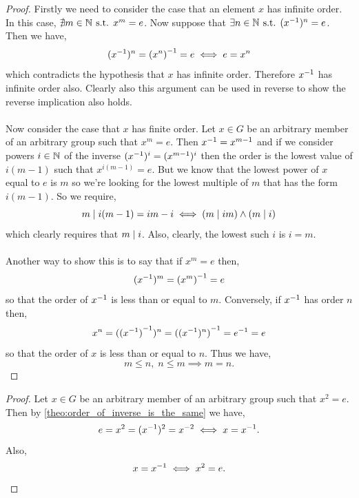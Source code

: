 \documentclass[MathsNotesBase.tex]{subfiles}
\begin{document}
{	
	\begin{proof}
		Firstly we need to consider the case that an element $x$ has infinite order. In this case, ${ \nexists m \in \mathbb{N}^{} \text{ s.t. } x^m = e }$. Now suppose that ${ \exists n \in \mathbb{N}^{} \text{ s.t. } ({x}^{-1})^n = e }$. Then we have,
		\[ ({x}^{-1})^n = {(x^n)}^{-1} = e \iff e = x^n \]
		which contradicts the hypothesis that $x$ has infinite order. Therefore ${ {x}^{-1} }$ has infinite order also. Clearly also this argument can be used in reverse to show the reverse implication also holds.\\\\
		Now consider the case that $x$ has finite order. Let ${ x \in G }$ be an arbitrary member of an arbitrary group such that ${ x^m = e }$. Then ${ {x}^{-1} = x^{m-1} }$ and if we consider powers ${ i \in \mathbb{N}^{} }$ of the inverse ${ ({x}^{-1})^i = (x^{m-1})^i }$ then the order is the lowest value of ${ i(m-1) }$ such that ${ x^{i(m-1)} = e }$. But we know that the lowest power of $x$ equal to $e$ is $m$ so we're looking for the lowest multiple of $m$ that has the form ${ i(m-1) }$. So we require,
		\[ m \mid i(m-1) = im - i \iff (m \mid im) \land (m \mid i) \]
		which clearly requires that ${ m \mid i }$. Also, clearly, the lowest such $i$ is ${ i = m }$.\\\\
		Another way to show this is to say that if ${ x^m = e }$ then,
		\[ ({x}^{-1})^m = {(x^m)}^{-1} = e \]
		so that the order of ${ {x}^{-1} }$ is less than or equal to $m$. Conversely, if ${ {x}^{-1} }$ has order $n$ then,
		\[ x^n = ({({x}^{-1})}^{-1})^n = {(({x}^{-1})^n)}^{-1} = {e}^{-1} = e \]
		so that the order of ${ x }$ is less than or equal to $n$. Thus we have,
		\[ m \leq n,\; n \leq m \implies m = n. \]
	\end{proof}

	\begin{proof}
		Let ${ x \in G }$ be an arbitrary member of an arbitrary group such that ${ x^2 = e }$. Then by \autoref{theo:order_of_inverse_is_the_same} we have,
		\[ e = x^2 = ({x}^{-1})^2 = x^{-2} \iff x = {x}^{-1}. \]
		Also,
		\[  x = {x}^{-1} \iff x^2 = e. \]
	\end{proof}

}
\end{document}

